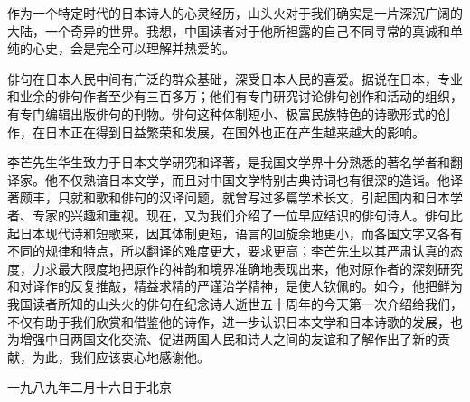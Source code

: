 {    作为一个特定时代的日本诗人的心灵经历，山头火对于我们确实是一片深沉广阔的大陆，一个奇异的世界。我想，中国读者对于他所袒露的自己不同寻常的真诚和单纯的心史，会是完全可以理解并热爱的。

    俳句在日本人民中间有广泛的群众基础，深受日本人民的喜爱。据说在日本，专业和业余的俳句作者至少有三百多万；他们有专门研究讨论俳句创作和活动的组织，有专门编辑出版俳句的刊物。俳句这种体制短小、极富民族特色的诗歌形式的创作，在日本正在得到日益繁荣和发展，在国外也正在产生越来越大的影响。

    李芒先生华生致力于日本文学研究和译著，是我国文学界十分熟悉的著名学者和翻译家。他不仅熟谙日本文学，而且对中国文学特别古典诗词也有很深的造诣。他译著颇丰，只就和歌和俳句的汉译问题，就曾写过多篇学术长文，引起国内和日本学者、专家的兴趣和重视。现在，又为我们介绍了一位早应结识的俳句诗人。俳句比起日本现代诗和短歌来，因其体制更短，语言的回旋余地更小，而各国文字又各有不同的规律和特点，所以翻译的难度更大，要求更高；李芒先生以其严肃认真的态度，力求最大限度地把原作的神韵和境界准确地表现出来，他对原作者的深刻研究和对译作的反复推敲，精益求精的严谨治学精神，是使人钦佩的。如今，他把鲜为我国读者所知的山头火的俳句在纪念诗人逝世五十周年的今天第一次介绍给我们，不仅有助于我们欣赏和借鉴他的诗作，进一步认识日本文学和日本诗歌的发展，也为增强中日两国文化交流、促进两国人民和诗人之间的友谊和了解作出了新的贡献，为此，我们应该衷心地感谢他。

    \bigskip

    \hfill 一九八九年二月十六日于北京
}

